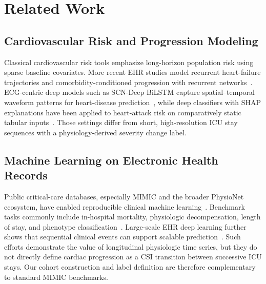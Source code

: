 \documentclass[conference]{IEEEtran}
\begin{document}
\section{Related Work}

\subsection{Cardiovascular Risk and Progression Modeling}
Classical cardiovascular risk tools emphasize long-horizon population risk using sparse baseline covariates. More recent EHR studies model recurrent heart-failure trajectories and comorbidity-conditioned progression with recurrent networks~\cite{lu2021dhtm}. ECG-centric deep models such as SCN-Deep BiLSTM capture spatial--temporal waveform patterns for heart-disease prediction~\cite{pandey2025scn}, while deep classifiers with SHAP explanations have been applied to heart-attack risk on comparatively static tabular inputs~\cite{dritsas2024heartattack}. Those settings differ from short, high-resolution ICU stay sequences with a physiology-derived severity change label.

\subsection{Machine Learning on Electronic Health Records}
Public critical-care databases, especially MIMIC and the broader PhysioNet ecosystem, have enabled reproducible clinical machine learning~\cite{johnson2023mimic,goldberger2000physionet,harutyunyan2019mimic,shickel2018deepehr}. Benchmark tasks commonly include in-hospital mortality, physiologic decompensation, length of stay, and phenotype classification~\cite{harutyunyan2019mimic}. Large-scale EHR deep learning further shows that sequential clinical events can support scalable prediction~\cite{rajkomar2018ehr}. Such efforts demonstrate the value of longitudinal physiologic time series, but they do not directly define cardiac progression as a CSI transition between successive ICU stays. Our cohort construction and label definition are therefore complementary to standard MIMIC benchmarks.
\end{document}
